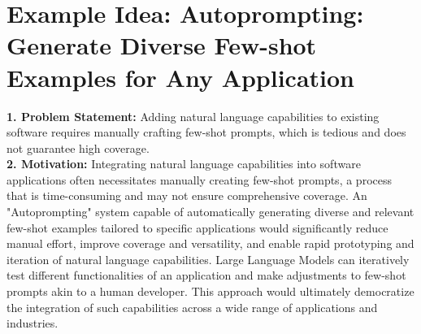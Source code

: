 \newpage 



\section{Example Idea: Autoprompting: Generate Diverse Few-shot Examples for Any Application}
\label{sec:example_7}

\begin{tcolorbox}[colback=blue!5!white,colframe=blue!75!black,title=\textbf{Autoprompting: Generate Diverse Few-Shot Examples for Any Application (Part 1)}]
\small{
\textbf{1. Problem Statement:} Adding natural language capabilities to existing software requires manually crafting few-shot prompts, which is tedious and does not guarantee high coverage.
\\

\textbf{2. Motivation:} Integrating natural language capabilities into software applications often necessitates manually creating few-shot prompts, a process that is time-consuming and may not ensure comprehensive coverage. An "Autoprompting" system capable of automatically generating diverse and relevant few-shot examples tailored to specific applications would significantly reduce manual effort, improve coverage and versatility, and enable rapid prototyping and iteration of natural language capabilities. Large Language Models can iteratively test different functionalities of an application and make adjustments to few-shot prompts akin to a human developer. This approach would ultimately democratize the integration of such capabilities across a wide range of applications and industries.
\\

}
\end{tcolorbox}
